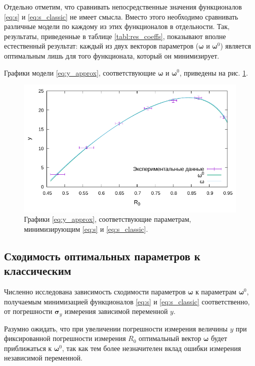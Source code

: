 \documentclass[tikz,10pt,a4paper]{article}
\newcommand{\bomega}{\boldsymbol{\omega}}
\begin{document}
Отдельно отметим, что сравнивать непосредственные значения функционалов \eqref{eq:s} и
\eqref{eq:s_classic} не имеет смысла. Вместо этого необходимо сравнивать различные
модели по каждому из этих функционалов в отдельности. Так, результаты, приведенные
в таблице \ref{tabl:res_coeffs}, показывают вполне естественный результат: каждый
из двух векторов параметров ($\bomega$ и $\bomega^0$) является оптимальным лишь
для того функционала, который он минимизирует.

Графики модели \eqref{eq:y_approx}, соответствующие $\bomega$ и $\bomega^0$, приведены
на рис. \ref{fig:results}.

\begin{figure}[h]
  \centering
  \includegraphics[width=\textwidth]{figs/levmar/results.pdf}
  \caption{Графики \eqref{eq:y_approx}, соответствующие параметрам,
	минимизирующим \eqref{eq:s} и \eqref{eq:s_classic}.}
  \label{fig:results}
\end{figure}

\subsection{Сходимость оптимальных параметров к классическим}
Численно исследована зависимость сходимости параметров $\bomega$ к параметрам $\bomega^0$,
получаемым минимизацией функционалов \eqref{eq:s} и \eqref{eq:s_classic} соответственно, от
погрешности $\mathbf{\sigma}_y$ измерения зависимой переменной $y$.

Разумно ожидать, что при увеличении погрешности измерения величины $y$ при
фиксированной погрешности измерения $R_0$ оптимальный вектор $\bomega$
будет приближаться к $\bomega^0$, так как тем более незначителен
вклад ошибки измерения независимой переменной.
\end{document}
